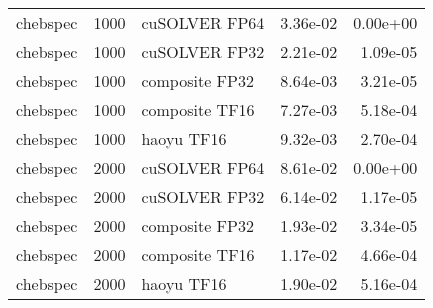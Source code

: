 \begin{table}
\begin{tabular}{lrlrr}
 chebspec &  1000 &  cuSOLVER FP64 &  3.36e-02 &        0.00e+00 \\
 chebspec &  1000 &  cuSOLVER FP32 &  2.21e-02 &        1.09e-05 \\
 chebspec &  1000 & composite FP32 &  8.64e-03 &        3.21e-05 \\
 chebspec &  1000 & composite TF16 &  7.27e-03 &        5.18e-04 \\
 chebspec &  1000 &     haoyu TF16 &  9.32e-03 &        2.70e-04 \\
 chebspec &  2000 &  cuSOLVER FP64 &  8.61e-02 &        0.00e+00 \\
 chebspec &  2000 &  cuSOLVER FP32 &  6.14e-02 &        1.17e-05 \\
 chebspec &  2000 & composite FP32 &  1.93e-02 &        3.34e-05 \\
 chebspec &  2000 & composite TF16 &  1.17e-02 &        4.66e-04 \\
 chebspec &  2000 &     haoyu TF16 &  1.90e-02 &        5.16e-04 \\
\bottomrule
\end{tabular}
\end{table}
